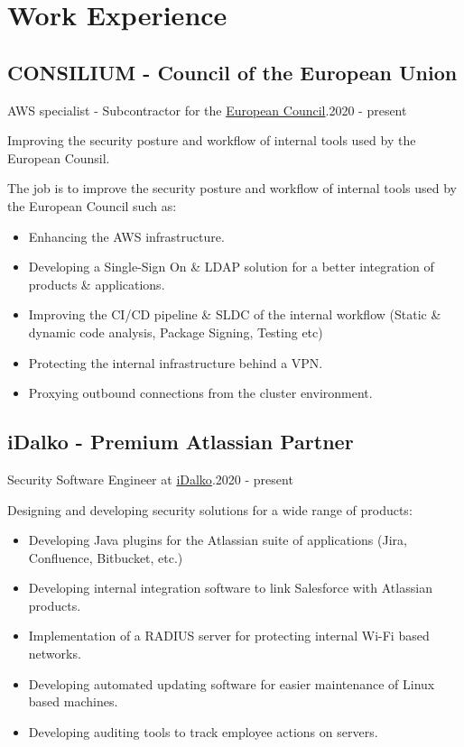 \section{Work Experie\textcolor{mycolor}{nce}}
  \subsection{CONSILIUM - Council of the European Union }
    AWS specialist - Subcontractor for the {\href{https://www.consilium.europa.eu/en/european-council/}{European Council}}.{\textcolor{mygrey}{\hspace*{\fill}2020 - present}}

    Improving the security posture and workflow of internal tools used by the European Counsil.

    The job is to improve the security posture and workflow of internal tools used by the European Council such as:
    \begin{itemize}
      \item Enhancing the AWS infrastructure.
      \item Developing a Single-Sign On \& LDAP solution for a better integration of products \& applications.
      \item Improving the CI/CD pipeline \& SLDC of the internal workflow (Static \& dynamic code analysis, Package Signing, Testing etc)
      \item Protecting the internal infrastructure behind a VPN.
      \item Proxying outbound connections from the cluster environment.
    \end{itemize}
  \subsection{iDalko - Premium Atlassian Partner}
    Security Software Engineer at {\href{https://www.idalko.com}{iDalko}}.{\textcolor{mygrey}{\hspace*{\fill}2020 - present}}

    Designing and developing security solutions for a wide range of products:

    \begin{itemize}
      \item Developing Java plugins for the Atlassian suite of applications (Jira, Confluence, Bitbucket, etc.)
      \item Developing internal integration software to link Salesforce with Atlassian products.
      \item Implementation of a RADIUS server for protecting internal Wi-Fi based networks.
      \item Developing automated updating software for easier maintenance of Linux based machines.
      \item Developing auditing tools to track employee actions on servers.
    \end{itemize}
